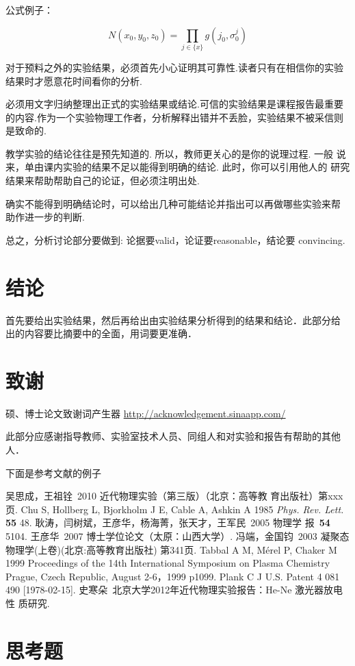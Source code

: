 \documentclass[aps,pre,12pt,preprint,onecolumn,showpacs,showkeys]{revtex4-1}
\begin{document}
公式例子：

\begin{equation}
N(x_0,y_0,z_0)=\prod_{j\in\{x\}}g(j_0,\sigma^j_0) \label{eq:1}
\end{equation}

对于预料之外的实验结果，必须首先小心证明其可靠性.读者只有在相信你的实验
结果时才愿意花时间看你的分析.

必须用文字归纳整理出正式的实验结果或结论.可信的实验结果是课程报告最重要
的内容.作为一个实验物理工作者，分析解释出错并不丢脸，实验结果不被采信则
是致命的.

教学实验的结论往往是预先知道的. 所以，教师更关心的是你的说理过程. 一般
说来，单由课内实验的结果不足以能得到明确的结论. 此时，你可以引用他人的
研究结果来帮助帮助自己的论证，但必须注明出处.

确实不能得到明确结论时，可以给出几种可能结论并指出可以再做哪些实验来帮
助作进一步的判断.

总之，分析讨论部分要做到: 论据要valid，论证要reasonable，结论要
convincing.

\section{结论}

首先要给出实验结果，然后再给出由实验结果分析得到的结果和结论．此部分给
出的内容要比摘要中的全面，用词要更准确．

\section{致谢}

硕、博士论文致谢词产生器
\href{http://acknowledgement.sinaapp.com/}{http://acknowledgement.sinaapp.com/}

此部分应感谢指导教师、实验室技术人员、同组人和对实验和报告有帮助的其他
人．


下面是参考文献的例子

\begin{thebibliography}{}
 吴思成，王祖铨~2010 近代物理实验（第三版）（北京：高等教
育出版社）第xxx页.  %
 Chu S, Hollberg L, Bjorkholm J E, Cable A, Ashkin A 1985
{\it Phys. Rev. Lett.} {\bf 55} 48.%
 耿涛，闫树斌，王彦华，杨海菁，张天才，王军民~2005 物理学
报~{\bf 54} 5104.%
 王彦华~2007 博士学位论文（太原：山西大学）.%
 冯端，金国钧~2003 凝聚态物理学(上卷)(北京:高等教育出版社)
第341页.%
 Tabbal A M, Mérel P, Chaker M 1999 Proceedings of the
14th International Symposium on Plasma Chemistry Prague, Czech
Republic, August 2-6，1999 p1099.%
 Plank C J U.S. Patent 4 081 490 [1978-02-15].%
 史寒朵~北京大学2012年近代物理实验报告：He-Ne 激光器放电性
质研究. %
\end{thebibliography}

\clearpage
\appendix
\section{思考题}
\end{document}
